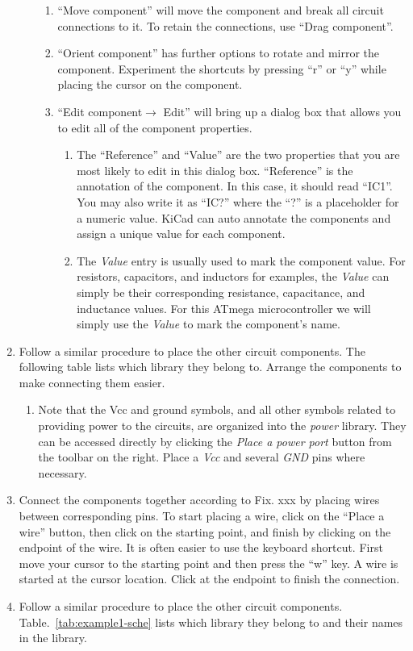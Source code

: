 \documentclass[12pt,letterpaper]{scrartcl}
\begin{document}
\begin{enumerate}
\begin{enumerate}
				\begin{enumerate}
					\item ``Move component'' will move the component and break all circuit connections to it. To retain the connections, use ``Drag component''. 
					\item ``Orient component'' has further options to rotate and mirror the component. Experiment the shortcuts by pressing ``r'' or ``y'' while placing the cursor on the component.
					\item ``Edit component$\rightarrow$ Edit'' will bring up a dialog box that allows you to edit all of the component properties. 
						\begin{enumerate}
							\item The ``Reference'' and ``Value'' are the two properties that you are most likely to edit in this dialog box. ``Reference'' is the annotation of the component. In this case, it should read ``IC1''. You may also write it as ``IC?'' where the ``?'' is a placeholder for a numeric value. KiCad can auto annotate the components and assign a unique value for each component. 
							\item The \emph{Value} entry is usually used to mark the component value. For resistors, capacitors, and inductors for examples, the \emph{Value} can simply be their corresponding resistance, capacitance, and inductance values. For this ATmega microcontroller we will simply use the \emph{Value} to mark the component’s name. 
						\end{enumerate}
				\end{enumerate}
		\end{enumerate}
	\item Follow a similar procedure to place the other circuit components. The following table lists which library they belong to. Arrange the components to make connecting them easier. 
		\begin{enumerate}
			\item Note that the Vcc and ground symbols, and all other symbols related to providing power to the circuits, are organized into the \emph{power} library. They can be accessed directly by clicking the \emph{Place a power port} button from the toolbar on the right. Place a \emph{Vcc} and several \emph{GND} pins where necessary.
		\end{enumerate}
	\item Connect the components together according to Fix. xxx by placing wires between corresponding pins. To start placing a wire, click on the ``Place a wire'' button, then click on the starting point, and finish by clicking on the endpoint of the wire. It is often easier to use the keyboard shortcut. First move your cursor to the starting point and then press the ``w'' key. A wire is started at the cursor location. Click at the endpoint to finish the connection. 
	\item Follow a similar procedure to place the other circuit components. Table.~\ref{tab:example1-sche} lists which library they belong to and their names in the library. 
	

\end{enumerate}
\end{document}
